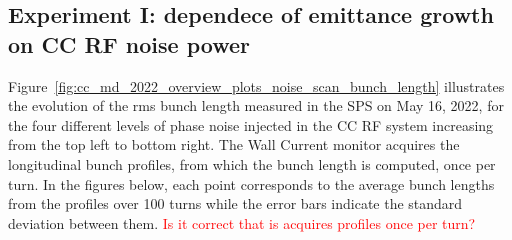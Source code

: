  


 \subsection{Experiment I: dependece of emittance growth on CC RF noise power}\label{subsec:2022_exp1_bunch_length}
 Figure~\ref{fig:cc_md_2022_overview_plots_noise_scan_bunch_length} illustrates the evolution of the rms bunch length measured in the SPS on May 16, 2022, for the four different levels of phase noise injected in the CC RF system increasing from the top left to bottom right. The Wall Current monitor acquires the longitudinal bunch profiles, from which the bunch length is computed, once per turn. In the figures below, each point corresponds to the average bunch lengths from the profiles over 100 turns while the error bars indicate the standard deviation between them. \textcolor{red}{Is it correct that is acquires profiles once per turn?}
